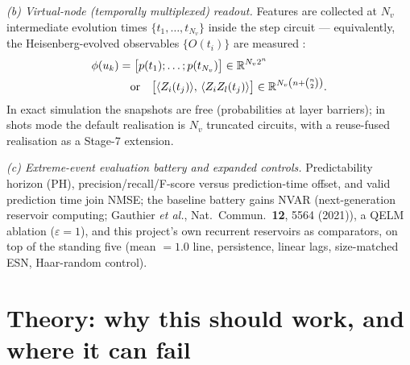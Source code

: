\emph{(b) Virtual-node (temporally multiplexed) readout.} Features are
collected at $N_v$ intermediate evolution times $\{t_1,\dots,t_{N_v}\}$
inside the step circuit --- equivalently, the Heisenberg-evolved observables
$\{O(t_i)\}$ are measured \citep{fujii2017harnessing,nakajima2019boosting}:
\begin{equation}
\begin{aligned}
\phi(u_k)&=\big[p(t_1);\dots;p(t_{N_v})\big]\in\mathbb{R}^{N_v 2^n}\\
&\quad\text{or}\quad
\big[\langle Z_i(t_j)\rangle,\,\langle Z_iZ_l(t_j)\rangle\big]\in\mathbb{R}^{N_v\left(n+\binom{n}{2}\right)}.
\end{aligned}
\end{equation}
In exact simulation the snapshots are free (probabilities at layer
barriers); in shots mode the default realisation is $N_v$ truncated
circuits, with a reuse-fused realisation as a Stage-7 extension.

\emph{(c) Extreme-event evaluation battery and expanded controls.}
Predictability horizon (PH), precision/recall/F-score versus
prediction-time offset, and valid prediction time join NMSE; the baseline
battery gains NVAR (next-generation reservoir computing; Gauthier
\emph{et al.}, Nat.\ Commun.\ \textbf{12}, 5564 (2021)), a QELM ablation
($\varepsilon=1$), and this project's own recurrent reservoirs as
comparators, on top of the standing five (mean $=1.0$ line, persistence,
linear lags, size-matched ESN, Haar-random control).

\section{Theory: why this should work, and where it can fail}
\label{sec:rfqrc-theory}

